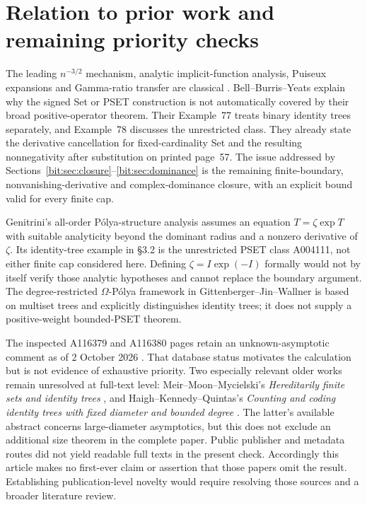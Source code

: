 \documentclass[11pt]{article}
\theoremstyle{definition}\newtheorem{definition}[theorem]{Definition}
\theoremstyle{remark}\newtheorem{remark}[theorem]{Remark}
\begin{document}
\section{Relation to prior work and remaining priority checks}
\label{bit:sec:prior}
The leading $n^{-3/2}$ mechanism, analytic implicit-function analysis, Puiseux expansions and Gamma-ratio transfer are classical \cite{fs}. Bell--Burris--Yeats \cite[\S\S6.1--6.2]{bby} explain why the signed Set or PSET construction is not automatically covered by their broad positive-operator theorem. Their Example~77 treats binary identity trees separately, and Example~78 discusses the unrestricted class. They already state the derivative cancellation for fixed-cardinality Set and the resulting nonnegativity after substitution on printed page~57. The issue addressed by Sections~\ref{bit:sec:closure}--\ref{bit:sec:dominance} is the remaining finite-boundary, nonvanishing-derivative and complex-dominance closure, with an explicit bound valid for every finite cap.

Genitrini's all-order P\'olya-structure analysis \cite{genitrini} assumes an equation $T=\zeta\exp T$ with suitable analyticity beyond the dominant radius and a nonzero derivative of $\zeta$. Its identity-tree example in \S3.2 is the unrestricted PSET class A004111, not either finite cap considered here. Defining $\zeta=I\exp(-I)$ formally would not by itself verify those analytic hypotheses and cannot replace the boundary argument. The degree-restricted $\Omega$-P\'olya framework in Gittenberger--Jin--Wallner \cite[\S5.2]{gjw} is based on multiset trees and explicitly distinguishes identity trees; it does not supply a positive-weight bounded-PSET theorem.

The inspected A116379 and A116380 pages retain an unknown-asymptotic comment as of 2 October 2026 \cite{oeis3,oeis4}. That database status motivates the calculation but is not evidence of exhaustive priority. Two especially relevant older works remain unresolved at full-text level: Meir--Moon--Mycielski's \emph{Hereditarily finite sets and identity trees} \cite{mmm}, and Haigh--Kennedy--Quintas's \emph{Counting and coding identity trees with fixed diameter and bounded degree} \cite{hkq}. The latter's available abstract concerns large-diameter asymptotics, but this does not exclude an additional size theorem in the complete paper. Public publisher and metadata routes did not yield readable full texts in the present check. Accordingly this article makes no first-ever claim or assertion that those papers omit the result. Establishing publication-level novelty would require resolving those sources and a broader literature review.
\end{document}
